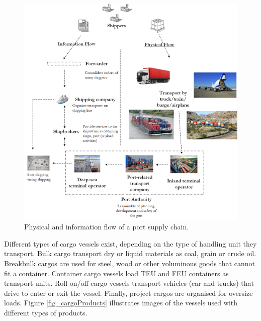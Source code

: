 \begin{figure}[hbt!]
\centering
\includegraphics[width=1.0\textwidth]{SectionDistribution/control_figures/fig_portFlows.png}
\captionsetup{type=figure}
\caption{Physical and information flow of a port supply chain.}
\label{fig_portFlows}
\end{figure}

Different types of cargo vessels exist, depending on the type of handling unit they transport. Bulk cargo transport dry or liquid materials as coal, grain or crude oil. Breakbulk cargos are used for steel, wood or other voluminous goods that cannot fit a container. Container cargo vessels load TEU and FEU containers as transport units. Roll-on/off cargo vessels transport vehicles (car and trucks) that drive to enter or exit the vessel. Finally, project cargos are organised for oversize loads. Figure \ref{fig_cargoProducts} illustrates images of the vessels used with different types of products.

